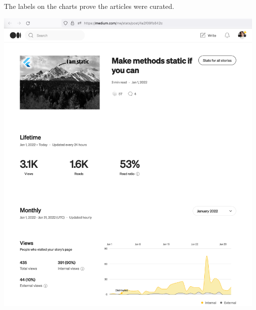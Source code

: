 
The labels  on the charts prove the articles were curated.

\begin{center}
    \includegraphics[width=\textwidth]{2022-01-01_static}
\end{center}
\pagebreak

